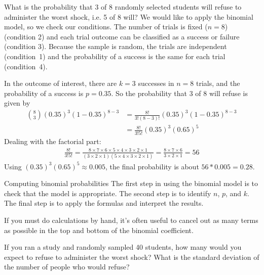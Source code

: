 \begin{examplewrap}
\begin{nexample}{What is the probability that 3 of 8 randomly selected students will refuse to administer the worst shock, i.e. 5 of 8 will?}
We would like to apply the binomial model, so we check our conditions. The number of trials is fixed ($n=8$) (condition 2) and each trial outcome can be classified as a success or failure (condition 3). Because the sample is random, the trials are independent (condition~1) and the probability of a success is the same for each trial (condition~4).

In the outcome of interest, there are $k=3$ successes in $n=8$ trials, and the probability of a success is $p=0.35$. So the probability that 3 of 8 will refuse is given by
\begin{align*}
{ 8 \choose 3}(0.35)^3(1-0.35)^{8-3}
	&= \frac{8!}{3!(8-3)!}(0.35)^3(1-0.35)^{8-3} \\
	&= \frac{8!}{3!5!}(0.35)^3(0.65)^5
\end{align*}
Dealing with the factorial part:
\begin{align*}
\frac{8!}{3!5!} = \frac{8\times7\times6\times5\times4\times3\times2\times1}{(3\times2\times1)(5\times4\times3\times2\times1)} = \frac{8\times7\times6}{3\times2\times1} = 56
\end{align*}
Using $(0.35)^3(0.65)^5 \approx 0.005$, the final probability is about $56*0.005 = 0.28$.
\end{nexample}
\end{examplewrap}

\begin{onebox}{Computing binomial probabilities}
  The first step in using the binomial model is to check
  that the model is appropriate.
  The second step is to identify $n$, $p$, and $k$.
  The final step is to apply the formulas and interpret
  the results.\vspace{3mm}

  If you must do calculations by hand, it's often useful
  to cancel out as many terms as possible in the top and
  bottom of the binomial coefficient.
\end{onebox}

\begin{exercisewrap}
\begin{nexercise}
If you ran a study and randomly sampled 40 students, how many would you expect to refuse to administer the worst shock?
What is the standard deviation of the number of people who would refuse?\footnotemark{}
\end{nexercise}
\end{exercisewrap}

